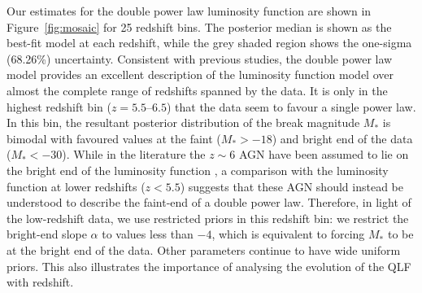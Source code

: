\documentclass[fleqn,usenatbib]{mnras}
\begin{document}
Our estimates for the double power law luminosity function are shown
in Figure~\ref{fig:mosaic} for 25 redshift bins.
The posterior median
is shown as the best-fit model at each redshift, while the grey shaded
region shows the one-sigma (68.26\%) uncertainty.  Consistent with
previous studies, the double power law model provides an excellent
description of the luminosity function model over almost the complete
range of redshifts spanned by the data.  It is only in the highest
redshift bin ($z=5.5$--$6.5$) that the data seem to favour a single
power law.  In this bin, the resultant posterior distribution of the
break magnitude $M_*$ is bimodal with favoured values at the faint
($M_*>-18$) and bright end of the data ($M_*<-30$).  While in the
literature the $z\sim 6$ AGN have been assumed to lie on the bright
end of the luminosity function \citep[e.g.,][]{2016ApJ...833..222J}, a
comparison with the luminosity function at lower redshifts ($z<5.5$)
suggests that these AGN should instead be understood to describe the
faint-end of a double power law.
Therefore, in light of the
low-redshift data, we use restricted priors in this
redshift bin: we
restrict the bright-end slope $\alpha$ to values less than $-4$,
which
is equivalent to forcing $M_*$ to be at the bright end of the data.
Other parameters continue to have wide uniform priors.  This also
illustrates the importance of analysing the evolution of the QLF with
redshift.
\end{document}
